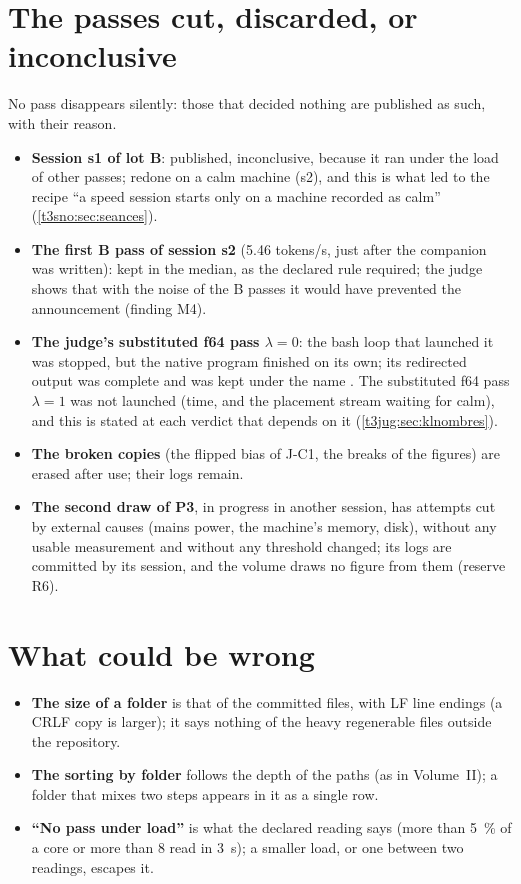 \section{The passes cut, discarded, or inconclusive}\label{t3ann:sec:coupees}

No pass disappears silently: those that decided nothing are published as such, with their reason.
\begin{itemize}
\item \textbf{Session s1 of lot B}: published, inconclusive, because it ran under the load of other passes; redone on a calm machine (s2), and this is what led to the recipe ``a speed session starts only on a machine recorded as calm'' (\cref{t3sno:sec:seances}).
\item \textbf{The first B pass of session s2} (\num{5.46} tokens/s, just after the companion was written): kept in the median, as the declared rule required; the judge shows that with the noise of the B passes it would have prevented the announcement (finding M4).
\item \textbf{The judge's substituted f64 pass $\lambda = 0$}: the bash loop that launched it was stopped, but the native program finished on its own; its redirected output was complete and was kept under the name . The substituted f64 pass $\lambda = 1$ was not launched (time, and the placement stream waiting for calm), and this is stated at each verdict that depends on it (\cref{t3jug:sec:klnombres}).
\item \textbf{The broken copies} (the flipped bias of J-C1, the breaks of the figures) are erased after use; their logs remain.
\item \textbf{The second draw of P3}, in progress in another session, has attempts cut by external causes (mains power, the machine's memory, disk), without any usable measurement and without any threshold changed; its logs are committed by its session, and the volume draws no figure from them (reserve R6).
\end{itemize}

\section*{What could be wrong}

\begin{faux}
\begin{itemize}
\item \textbf{The size of a folder} is that of the committed files, with LF line endings (a CRLF copy is larger); it says nothing of the heavy regenerable files outside the repository.
\item \textbf{The sorting by folder} follows the depth of the paths (as in Volume~II); a folder that mixes two steps appears in it as a single row.
\item \textbf{``No pass under load''} is what the declared reading says (more than \SI{5}{\percent} of a core or more than \SI{8}{\Mo} read in \SI{3}{\second}); a smaller load, or one between two readings, escapes it.
\end{itemize}
\end{faux}
